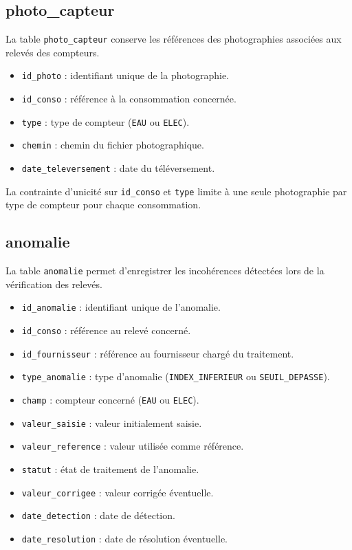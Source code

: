 \subsection{photo\_capteur}

La table \texttt{photo\_capteur} conserve les références des photographies associées aux relevés des compteurs.

\begin{itemize}[leftmargin=*]
    \item \texttt{id\_photo} : identifiant unique de la photographie.
    \item \texttt{id\_conso} : référence à la consommation concernée.
    \item \texttt{type} : type de compteur (\texttt{EAU} ou \texttt{ELEC}).
    \item \texttt{chemin} : chemin du fichier photographique.
    \item \texttt{date\_televersement} : date du téléversement.
\end{itemize}

La contrainte d'unicité sur \texttt{id\_conso} et \texttt{type} limite à une seule photographie par type de compteur pour chaque consommation.

\subsection{anomalie}

La table \texttt{anomalie} permet d'enregistrer les incohérences détectées lors de la vérification des relevés.

\begin{itemize}[leftmargin=*]
    \item \texttt{id\_anomalie} : identifiant unique de l'anomalie.
    \item \texttt{id\_conso} : référence au relevé concerné.
    \item \texttt{id\_fournisseur} : référence au fournisseur chargé du traitement.
    \item \texttt{type\_anomalie} : type d'anomalie (\texttt{INDEX\_INFERIEUR} ou \texttt{SEUIL\_DEPASSE}).
    \item \texttt{champ} : compteur concerné (\texttt{EAU} ou \texttt{ELEC}).
    \item \texttt{valeur\_saisie} : valeur initialement saisie.
    \item \texttt{valeur\_reference} : valeur utilisée comme référence.
    \item \texttt{statut} : état de traitement de l'anomalie.
    \item \texttt{valeur\_corrigee} : valeur corrigée éventuelle.
    \item \texttt{date\_detection} : date de détection.
    \item \texttt{date\_resolution} : date de résolution éventuelle.
\end{itemize}

